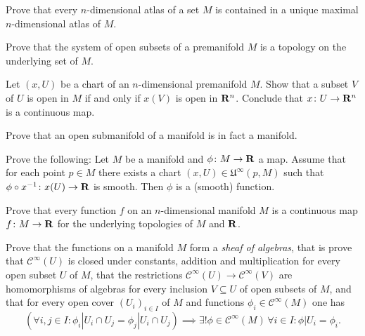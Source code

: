 \begin{xca}
  Prove that every $n$-dimensional atlas of a set $M$ is contained in a unique
  maximal $n$-dimensional atlas of $M$.
\end{xca}

\begin{xca}
  Prove that the system of open subsets of a premanifold $M$ is a topology on
  the underlying set of $M$.
\end{xca}

\begin{xca}
  Let $(x, U)$ be a chart of an $n$-dimensional premanifold $M$. Show that a 
  subset $V$ of $U$ is open in $M$ if and only if $x(V)$ is open in $\mathbf{R}^n$.
  Conclude that $x\colon U \to \mathbf{R}^n$ is a continuous map.
\end{xca}

\begin{xca}
  Prove that an open submanifold of a manifold is in fact a manifold.
\end{xca}

\begin{xca}
  Prove the following:
  Let $M$ be a manifold and $\phi\colon M \to \mathbf{R}$ a map. Assume that for each
  point $p \in M$ there exists a chart $(x, U) \in \mathfrak U^\infty(p, M)$
  such that $\phi \circ x^{-1}\colon x(U) \to \mathbf{R}$ is smooth. Then $\phi$
  is a (smooth) function.
\end{xca}

\begin{xca}
  Prove that every function $f$ on an $n$-dimensional manifold $M$ is a
  continuous map $f\colon M \to \mathbf{R}$ for the underlying topologies of $M$ and
  $\mathbf{R}$.
\end{xca}

\begin{xca}
  Prove that the functions on a manifold $M$ form a \emph{sheaf of algebras},
  that is prove that $\mathcal C^\infty(U)$ is closed under constants,
  addition and multiplication for every open subset $U$ of $M$, that the restrictions
  $\mathcal C^\infty(U) \to \mathcal C^\infty(V)$ are homomorphisms of algebras
  for every inclusion $V \subseteq U$ of open subsets of $M$, and that 
  for every open cover $(U_i)_{i \in I}$ of $M$ and functions
  $\phi_i \in \mathcal C^\infty(M)$ one has
  \[
    \left(\forall i, j \in I : \phi_i|U_i \cap U_j = \phi_j|U_i \cap U_j\right)
    \implies \exists! \phi \in \mathcal C^\infty(M) \, \forall i \in I :
    \phi|U_i = \phi_i.
  \]
\end{xca}

